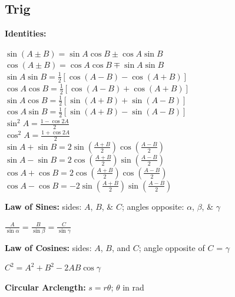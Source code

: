\documentclass[letterpaper,landscape,10pt]{article}
\begin{document}
{\begin{multicols}{4}
   \subsection*{Trig}
   \textbf{Identities:}
   \vspace{-5pt}
   \begin{center}
   	$\displaystyle\sin (A\pm B) =  \sin A\cos B\pm \cos A\sin B$ \\
   	$\displaystyle\cos (A\pm B) =  \cos A\cos B\mp \sin A\sin B$ \\
   	\vspace{4pt}
   	$\displaystyle\sin A\sin B =
   		\frac{1}{2}\left[\cos(A-B)-\cos(A+B)\right]$\\
   	$\displaystyle\cos A\cos B =
   		\frac{1}{2}\left[\cos(A-B)+\cos(A+B)\right]$\\
   	$\displaystyle\sin A\cos B =
   		\frac{1}{2}\left[\sin(A+B)+\sin(A-B)\right]$\\
   	$\displaystyle\cos A\sin B =
   		\frac{1}{2}\left[\sin(A+B)-\sin(A-B)\right]$\\
   	\vspace{4pt}
   	$\displaystyle\sin^{2}A =  \frac{1-\cos 2A}{2}$ \\
   	$\displaystyle\cos^{2}A =  \frac{1+\cos 2A}{2}$ \\
   	\vspace{4pt}
   	$\displaystyle\sin A + \sin B =  2\sin\left(\frac{A+B}{2}\right)
   		\cos\left(\frac{A-B}{2}\right)$ \\
   	$\displaystyle\sin A - \sin B =  2\cos\left(\frac{A+B}{2}\right)
   		\sin\left(\frac{A-B}{2}\right)$ \\
   	$\displaystyle\cos A + \cos B =  2\cos\left(\frac{A+B}{2}\right)
   		\cos\left(\frac{A-B}{2}\right)$ \\
   	$\displaystyle\cos A - \cos B =  -2\sin\left(\frac{A+B}{2}\right)
   		\sin\left(\frac{A-B}{2}\right)$
   \end{center}
   	\textbf{Law of Sines:} sides: $A$, $B$, \& $C$; angles opposite:
   	$\alpha$, $\beta$, \& $\gamma$
   \begin{center}
   	$\frac{A}{\sin \alpha} = \frac{B}{\sin \beta} = \frac{C}{\sin
   		\gamma}$
   \end{center}
   	\textbf{Law of Cosines:} sides: $A$, $B$, and $C$; angle opposite of
   	$C$ = $\gamma$
   \begin{center}
   	$C^2 = A^2 + B^2 - 2AB \cos \gamma$
   \end{center}
		\textbf{Circular Arclength:} $s = r\theta$; $\theta$ in rad


\end{multicols}}
\end{document}
